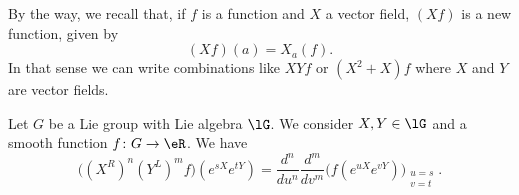 \begin{normaltext}
	By the way, we recall that, if \( f\) is a function and \( X\) a vector field, \( (Xf)\) is a new function, given by
	\begin{equation}
		(Xf)(a)=X_a(f).
	\end{equation}
	In that sense we can write combinations like \( XYf\) or \( (X^2+X)f\) where \( X\) and \( Y\) are vector fields.
\end{normaltext}

\begin{proposition}       \label{PROPooKSIDooVIFkiM}
	Let \( G\) be a Lie group with Lie algebra \( \lG\). We consider \( X,Y\in \lG\) and a smooth function \( f\colon G\to \eR\). We have
	\begin{equation}
		\big( (X^R)^n(Y^L)^mf \big)( e^{sX} e^{tY})=\frac{ d^n }{ du^n }\frac{ d^m }{ dv^m }\Big( f( e^{uX} e^{vY}) \Big)_{\substack{u=s\\v=t}}.
	\end{equation}
\end{proposition}

